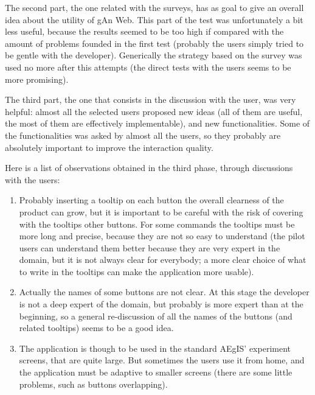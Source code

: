 The second part, the one related with the surveys, has as goal to give an overall idea about the utility of gAn Web. This part of the test was unfortunately a bit less useful, because the results seemed to be too high if compared with the amount of problems founded in the first test (probably the users simply tried to be gentle with the developer). Generically the strategy based on the survey was used no more after this attempts (the direct tests with the users seems to be more promising).

The third part, the one that consists in the discussion with the user, was very helpful: almost all the selected users proposed new ideas (all of them are useful, the most of them are effectively implementable), and new functionalities. Some of the functionalities was asked by almost all the users, so they probably are absolutely important to improve the interaction quality. 

Here is a list of observations obtained in the third phase, through discussions with the users:

\begin{enumerate}

\item 
Probably inserting a tooltip on each button the overall clearness of the product can grow, but it is important to be careful with the risk of covering with the tooltips other buttons. For some commands the tooltips must be more long and precise, because they are not so easy to understand (the pilot users can understand them better because they are very expert in the domain, but it is not always clear for everybody; a more clear choice of what to write in the tooltips can make the application more usable).  

\item
Actually the names of some buttons are not clear. At this stage the developer is not a deep expert of the domain, but probably is more expert than at the beginning, so a general re-discussion of all the names of the buttons (and related tooltips) seems to be a good idea.

\item 
The application is though to be used in the standard AEgIS' experiment screens, that are quite large. But sometimes the users use it from home, and the application must be adaptive to smaller screens (there are some little problems, such as buttons overlapping).

\end{enumerate}

